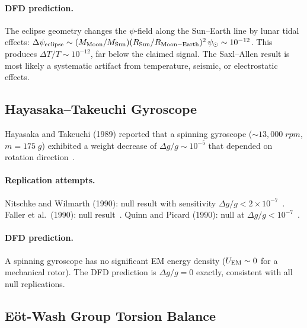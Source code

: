 \documentclass[aps,prd,twocolumn,superscriptaddress,floatfix,nofootinbib]{revtex4-2}
\begin{document}
\paragraph{DFD prediction.}
The eclipse geometry changes the $\psi$-field along the Sun--Earth
line by lunar tidal effects:
$\Delta\psi_{\rm eclipse} \sim (M_{\rm Moon}/M_{\rm Sun})
(R_{\rm Sun}/R_{\rm Moon-Earth})^2\,\psi_\odot \sim 10^{-12}$.
This produces $\Delta T/T \sim 10^{-12}$, far below the claimed signal.
The Saxl--Allen result is most likely a systematic artifact from
temperature, seismic, or electrostatic effects.

\subsection{Hayasaka--Takeuchi Gyroscope}\label{sec:hayasaka}

Hayasaka and Takeuchi (1989) reported that a spinning gyroscope
($\sim 13{,}000\;\si{rpm}$, $m = 175\;\si{g}$) exhibited a weight
decrease of $\Delta g/g \sim 10^{-5}$ that depended on rotation
direction~\cite{Hayasaka1989}.

\paragraph{Replication attempts.}
Nitschke and Wilmarth (1990): null result with sensitivity
$\Delta g/g < 2\times10^{-7}$~\cite{Nitschke1990}.
Faller et al.\ (1990): null result~\cite{Faller1990}.
Quinn and Picard (1990): null at $\Delta g/g < 10^{-7}$~\cite{Quinn1990}.

\paragraph{DFD prediction.}
A spinning gyroscope has no significant EM energy density
($U_{\rm EM} \sim 0$ for a mechanical rotor). The DFD prediction
is $\Delta g/g = 0$ exactly, consistent with all null replications.

\subsection{E\"ot-Wash Group Torsion Balance}\label{sec:eotwash}
\end{document}

